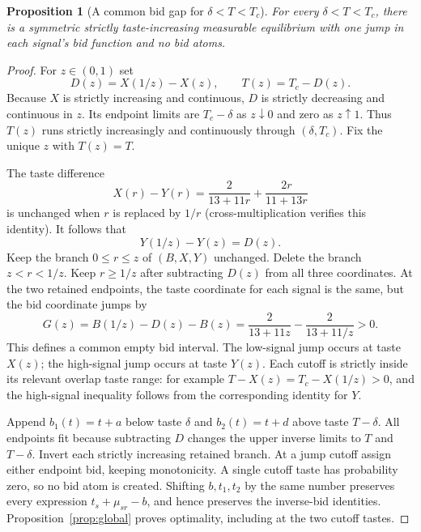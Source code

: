 \documentclass[11pt,a4paper]{article}
\newtheorem{proposition}[theorem]{Proposition}
\theoremstyle{remark}\newtheorem{remark}[theorem]{Remark}
\begin{document}
\begin{proposition}[A common bid gap for $\delta<T<T_c$]\label{prop:jump}
For every $\delta<T<T_c$, there is a symmetric strictly taste-increasing measurable equilibrium with one jump in each signal's bid function and no bid atoms.
\end{proposition}
\begin{proof}
For $z\in(0,1)$ set
\[
 D(z)=X(1/z)-X(z),\qquad T(z)=T_c-D(z).
\]
Because $X$ is strictly increasing and continuous, $D$ is strictly decreasing and continuous in $z$. Its endpoint limits are $T_c-\delta$ as $z\downarrow0$ and zero as $z\uparrow1$. Thus $T(z)$ runs strictly increasingly and continuously through $(\delta,T_c)$. Fix the unique $z$ with $T(z)=T$.

The taste difference
\[
 X(r)-Y(r)=\frac2{13+11r}+\frac{2r}{11+13r}
\]
is unchanged when $r$ is replaced by $1/r$ (cross-multiplication verifies this identity). It follows that
\[
 Y(1/z)-Y(z)=D(z).
\]
Keep the branch $0\le r\le z$ of $(B,X,Y)$ unchanged. Delete the branch $z<r<1/z$. Keep $r\ge1/z$ after subtracting $D(z)$ from all three coordinates. At the two retained endpoints, the taste coordinate for each signal is the same, but the bid coordinate jumps by
\[
 G(z)=B(1/z)-D(z)-B(z)
   =\frac2{13+11z}-\frac2{13+11/z}>0.
\]
This defines a common empty bid interval. The low-signal jump occurs at taste $X(z)$; the high-signal jump occurs at taste $Y(z)$. Each cutoff is strictly inside its relevant overlap taste range: for example $T-X(z)=T_c-X(1/z)>0$, and the high-signal inequality follows from the corresponding identity for $Y$.

Append $b_1(t)=t+a$ below taste $\delta$ and $b_2(t)=t+d$ above taste $T-\delta$. All endpoints fit because subtracting $D$ changes the upper inverse limits to $T$ and $T-\delta$. Invert each strictly increasing retained branch. At a jump cutoff assign either endpoint bid, keeping monotonicity. A single cutoff taste has probability zero, so no bid atom is created. Shifting $b,t_1,t_2$ by the same number preserves every expression $t_s+\mu_{sr}-b$, and hence preserves the inverse-bid identities. Proposition~\ref{prop:global} proves optimality, including at the two cutoff tastes.
\end{proof}
\end{document}
